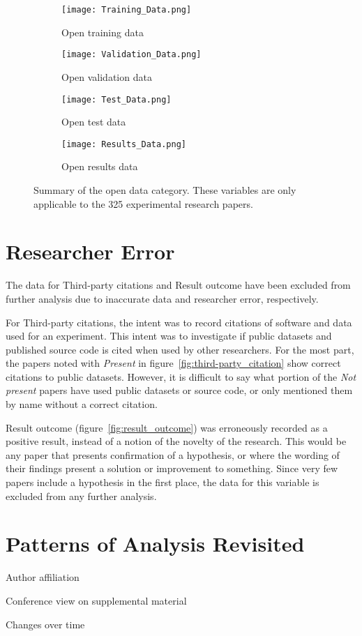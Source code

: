 \begin{figure}[!h]
\begin{center}
    \begin{subfigure}[b]{0.4\textwidth}
        \texttt{[image: Training\_Data.png]}
        \caption{Open training data}
        \label{fig:training}
    \end{subfigure}
    \begin{subfigure}[b]{0.4\textwidth}
        \texttt{[image: Validation\_Data.png]}
        \caption{Open validation data}
        \label{fig:validation}
    \end{subfigure}
    \begin{subfigure}[b]{0.4\textwidth}
        \texttt{[image: Test\_Data.png]}
        \caption{Open test data}
        \label{fig:test}
    \end{subfigure}
    \begin{subfigure}[b]{0.4\textwidth}
        \texttt{[image: Results\_Data.png]}
        \caption{Open results data}
        \label{fig:results}
    \end{subfigure}
    \caption[Summary of the open data category.]{Summary of the open data category. These variables are only applicable to the 325 experimental research papers.}
    \label{fig:open_data}
\end{center}
\end{figure}
\clearpage

\section{Researcher Error}
\label{sec:researcher_error}
The data for Third-party citations and Result outcome have been excluded from further analysis due to inaccurate data and researcher error, respectively.

For Third-party citations, the intent was to record citations of software and data used for an experiment. This intent was to investigate if public datasets and published source code is cited when used by other researchers. For the most part, the papers noted with \emph{Present} in figure~\ref{fig:third-party_citation} show correct citations to public datasets. However, it is difficult to say what portion of the \emph{Not present} papers have used public datasets or source code, or only mentioned them by name without a correct citation.

Result outcome (figure~\ref{fig:result_outcome}) was erroneously recorded as a positive result, instead of a notion of the novelty of the research. This would be any paper that presents confirmation of a hypothesis, or where the wording of their findings present a solution or improvement to something. Since very few papers include a hypothesis in the first place, the data for this variable is excluded from any further analysis.

\section{Patterns of Analysis Revisited}
Author affiliation

Conference view on supplemental material

Changes over time

\cleardoublepage
